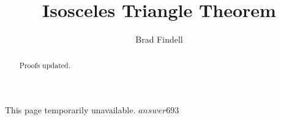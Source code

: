 \documentclass[nooutcomes]{ximera}
\title{Isosceles Triangle Theorem}
\author{Brad Findell}
\begin{document}
\begin{abstract}
Proofs updated. 
\end{abstract}
\maketitle

%
%

\begin{problem}
This page temporarily unavailable.  $answer{693}$
\end{problem}

%
\end{document}
